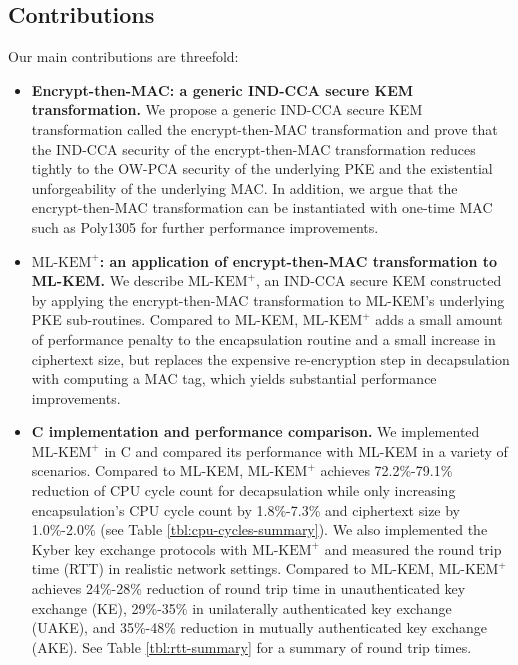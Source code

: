 \documentclass[journal=tches,submission]{iacrtrans}
\def\mlkemplus{\text{ML-KEM}^+}
\begin{document}
\subsection{Contributions}
Our main contributions are threefold: \begin{itemize}
    \item \textbf{Encrypt-then-MAC: a generic IND-CCA secure KEM transformation.} We propose a generic IND-CCA secure KEM transformation called the encrypt-then-MAC transformation and prove that the IND-CCA security of the encrypt-then-MAC transformation reduces tightly to the OW-PCA security of the underlying PKE and the existential unforgeability of the underlying MAC. In addition, we argue that the encrypt-then-MAC transformation can be instantiated with one-time MAC such as Poly1305 for further performance improvements.
    \item \textbf{$\mlkemplus$: an application of encrypt-then-MAC transformation to ML-KEM.} We describe $\mlkemplus$, an IND-CCA secure KEM constructed by applying the encrypt-then-MAC transformation to ML-KEM's underlying PKE sub-routines. Compared to ML-KEM, $\mlkemplus$ adds a small amount of performance penalty to the encapsulation routine and a small increase in ciphertext size, but replaces the expensive re-encryption step in decapsulation with computing a MAC tag, which yields substantial performance improvements.
    \item \textbf{C implementation and performance comparison.} We implemented $\mlkemplus$ in C and compared its performance with ML-KEM in a variety of scenarios. Compared to ML-KEM, $\mlkemplus$ achieves 72.2\%-79.1\% reduction of CPU cycle count for decapsulation while only increasing encapsulation's CPU cycle count by 1.8\%-7.3\% and ciphertext size by 1.0\%-2.0\% (see Table \ref{tbl:cpu-cycles-summary}). We also implemented the Kyber key exchange protocols \cite{DBLP:conf/eurosp/BosDKLLSSSS18} with $\mlkemplus$ and measured the round trip time (RTT) in realistic network settings. Compared to ML-KEM, $\mlkemplus$ achieves 24\%-28\% reduction of round trip time in unauthenticated key exchange (KE), 29\%-35\% in unilaterally authenticated key exchange (UAKE), and 35\%-48\% reduction in mutually authenticated key exchange (AKE). See Table \ref{tbl:rtt-summary} for a summary of round trip times.
\end{itemize}
\end{document}

